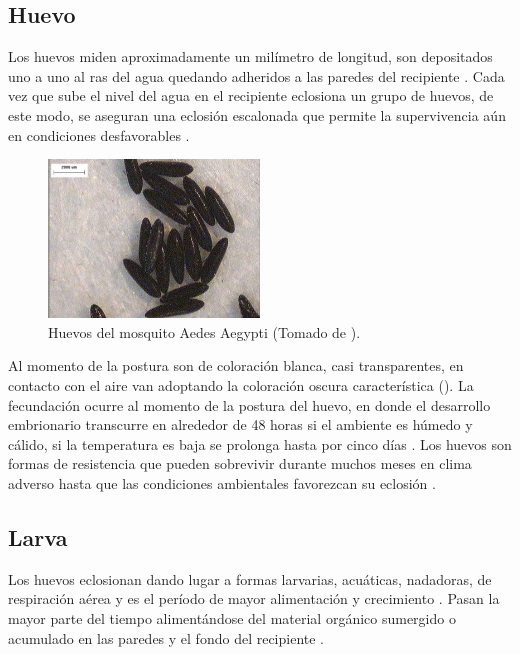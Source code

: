 \subsection{Huevo}
\label{subsec:ciclo-biologico-huevo}
Los huevos miden aproximadamente un milímetro de longitud, son depositados uno a uno al ras del
agua quedando adheridos a las paredes del recipiente \cite{ThironIzcazaJ2003}. Cada vez que sube el
nivel del agua en el recipiente eclosiona un grupo de huevos, de este modo, se aseguran una
eclosión escalonada que permite la supervivencia aún en condiciones desfavorables
\cite{directricesDetvArg}.

\begin{figure}[H]
\centering
\includegraphics[width=0.5\textwidth]{capitulo-3/graphics/huevos.png}
\caption{\label{fig:cap3-huevos} Huevos del mosquito Aedes Aegypti (Tomado de
\cite{sivanathan2006ecology}).}
\end{figure}

Al momento de la postura son de coloración blanca, casi transparentes, en contacto con el aire van
adoptando la coloración oscura característica \cite{directricesDetvArg} ().
La fecundación ocurre al momento de la postura del huevo, en donde el desarrollo embrionario
transcurre en alrededor de 48 horas si el ambiente es húmedo y cálido, si la temperatura es baja
se prolonga hasta por cinco días \cite{ThironIzcazaJ2003}. Los huevos son formas de resistencia que
pueden sobrevivir durante muchos meses en clima adverso hasta que las condiciones ambientales
favorezcan su eclosión \cite{directricesDetvArg}.

\subsection{Larva}
\label{subsec:ciclo-biologico-larva}
Los huevos eclosionan dando lugar a formas larvarias, acuáticas, nadadoras, de respiración aérea
\cite{directricesDetvArg} y es el período de mayor alimentación y crecimiento
\cite{web-site:gMonteroBiologia}. Pasan la mayor parte del tiempo alimentándose del material
orgánico sumergido o acumulado en las paredes y el fondo del recipiente
\cite{web-site:gMonteroBiologia, directricesDetvArg}.

